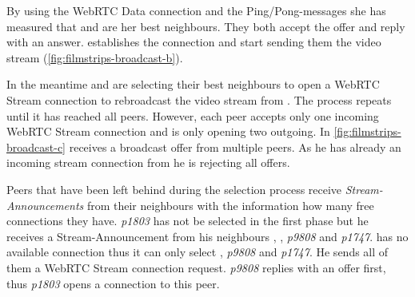 By using the WebRTC Data connection and the Ping/Pong-messages she has measured that \alice and \bob are her best neighbours. They both accept the offer and reply with an answer. \claire establishes the connection and start sending them the video stream (\vref{fig:filmstrips-broadcast-b}).

In the meantime \alice and \bob are selecting their best neighbours to open a WebRTC Stream connection to rebroadcast the video stream from \claire. The process repeats until it has reached all peers. However, each peer accepts only one incoming WebRTC Stream connection and is only opening two outgoing.
In \vref{fig:filmstrips-broadcast-c} \don receives a broadcast offer from multiple peers. As he has already an incoming stream connection from \alice he is rejecting all offers.

Peers that have been left behind during the selection process receive \textit{Stream-Announcements} from their neighbours with the information how many free connections they have. \textit{p1803} has not be selected in the first phase but he receives a Stream-Announcement from his neighbours \claire, \don, \textit{p9808} and \textit{p1747}. \claire has no available connection thus it can only select \don, \textit{p9808} and \textit{p1747}. He sends all of them a WebRTC Stream connection request. \textit{p9808} replies with an offer first, thus \textit{p1803} opens a connection to this peer.

